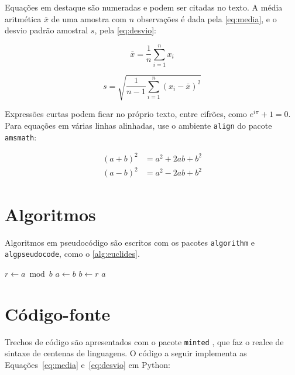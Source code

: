 Equações em destaque são numeradas e podem ser citadas no texto. A média aritmética $\bar{x}$ de uma amostra com $n$ observações é dada pela \autoref{eq:media}, e o desvio padrão amostral $s$, pela \autoref{eq:desvio}:

\begin{equation}\label{eq:media}
	\bar{x} = \frac{1}{n} \sum_{i=1}^{n} x_i
\end{equation}

\begin{equation}\label{eq:desvio}
	s = \sqrt{\frac{1}{n-1} \sum_{i=1}^{n} \left( x_i - \bar{x} \right)^2}
\end{equation}

Expressões curtas podem ficar no próprio texto, entre cifrões, como $e^{i\pi} + 1 = 0$. Para equações em várias linhas alinhadas, use o ambiente \texttt{align} do pacote \texttt{amsmath}:

\begin{align}
	(a + b)^2 &= a^2 + 2ab + b^2 \label{eq:quadrado-soma}\\
	(a - b)^2 &= a^2 - 2ab + b^2 \label{eq:quadrado-diferenca}
\end{align}

\section{Algoritmos}\label{sec:algoritmos}

Algoritmos em pseudocódigo são escritos com os pacotes \texttt{algorithm} e \texttt{algpseudocode}, como o \autoref{alg:euclides}.

\begin{algorithm}[htbp]
	\caption{Máximo divisor comum (algoritmo de Euclides)}\label{alg:euclides}
	\begin{algorithmic}[1]
				\State $r \gets a \bmod b$
				\State $a \gets b$
				\State $b \gets r$
			\EndWhile
			\State \Return $a$
		\EndFunction
	\end{algorithmic}
\end{algorithm}

\section{Código-fonte}\label{sec:codigo}

Trechos de código são apresentados com o pacote \texttt{minted} \cite{minted}, que faz o realce de sintaxe de centenas de linguagens. O código a seguir implementa as Equações~\ref{eq:media} e~\ref{eq:desvio} em Python:

